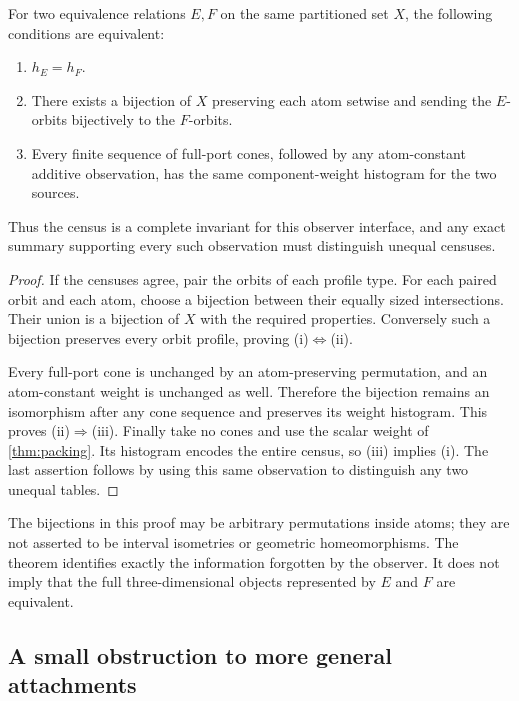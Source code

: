 \begin{theorem}
\label{thm:observational}
For two equivalence relations $E,F$ on the same partitioned set $X$, the
following conditions are equivalent:
\begin{enumerate}[label=(\roman*)]
\item $h_E=h_F$.
\item There exists a bijection of $X$ preserving each atom setwise and
sending the $E$-orbits bijectively to the $F$-orbits.
\item Every finite sequence of full-port cones, followed by any
atom-constant additive observation, has the same component-weight histogram
for the two sources.
\end{enumerate}
Thus the census is a complete invariant for this observer interface, and
any exact summary supporting every such observation must distinguish
unequal censuses.
\end{theorem}

\begin{proof}
If the censuses agree, pair the orbits of each profile type. For each paired
orbit and each atom, choose a bijection between their equally sized
intersections. Their union is a bijection of $X$ with the required
properties. Conversely such a bijection preserves every orbit profile,
proving (i)$\Leftrightarrow$(ii).

Every full-port cone is unchanged by an atom-preserving permutation, and an
atom-constant weight is unchanged as well. Therefore the bijection remains
an isomorphism after any cone sequence and preserves its weight histogram.
This proves (ii)$\Rightarrow$(iii). Finally take no cones and use the scalar
weight of \cref{thm:packing}. Its histogram encodes the entire census, so
(iii) implies (i). The last assertion follows by using this same
observation to distinguish any two unequal tables.
\end{proof}

The bijections in this proof may be arbitrary permutations inside atoms;
they are not asserted to be interval isometries or geometric homeomorphisms.
The theorem identifies exactly the information forgotten by the observer.
It does not imply that the full three-dimensional objects represented by
$E$ and $F$ are equivalent.

\subsection{A small obstruction to more general attachments}

